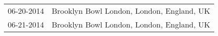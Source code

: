 \begin{supertabular}{ll}
 06-20-2014 &  Brooklyn Bowl London, London, England, UK \\
 06-21-2014 &  Brooklyn Bowl London, London, England, UK \\
\end{supertabular}
